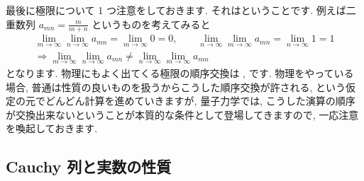 \documentclass[openany, a4paper, oneside]{jsbook}
\theoremstyle{break}
\theoremstyle{breakdefn}
\begin{document}
最後に極限について 1 つ注意をしておきます.
それはということです.
例えば二重数列 $a_{mn}=\frac{m}{m+n}$ というものを考えてみると
    \begin{gather}
        \lim_{m\to\infty} \lim_{n\to\infty}a_{mn}
        =
        \lim_{m\to\infty}0
        =
        0,
        \qquad
        \lim_{n\to\infty} \lim_{m\to\infty}a_{mn}
        =
        \lim_{n\to\infty}1
        =1\\
        \Longrightarrow
        \lim_{m\to\infty} \lim_{n\to\infty}a_{mn}
        \not=
        \lim_{n\to\infty} \lim_{m\to\infty}a_{mn}
    \end{gather}
となります. 物理にもよく出てくる極限の順序交換は
, です.
物理をやっている場合, 普通は性質の良いものを扱うからこうした順序交換が許される, という仮定の元でどんどん計算を進めていきますが,
量子力学では, こうした演算の順序が交換出来ないということが本質的な条件として登場してきますので, 一応注意を喚起しておきます.
\subsection{Cauchy 列と実数の性質}
\end{document}
